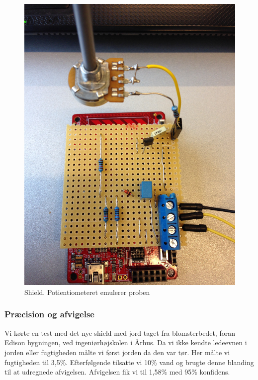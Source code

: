 \begin{figure}[H]
	\centering 
\includegraphics[scale=0.08]{HardwareArkitektur/Sensore/Jordfugt_billeder/shield.JPG}
	\caption{Shield. Potientiometeret emulerer proben}
	\label{photo:shield}
\end{figure} 

\subsubsection{Præcision og afvigelse}
Vi kørte en test med det nye shield med jord taget fra blomsterbedet, foran Edison bygningen, ved ingeniørhøjskolen i Århus. Da vi ikke kendte ledeevnen i jorden eller fugtigheden målte vi først jorden da den var tør. Her målte vi fugtigheden til 3,5\%. Efterfølgende tilsatte vi 10\% vand og brugte denne blanding til at udregnede afvigelsen. Afvigelsen fik vi til 1,58\% med 95\% konfidens. 

